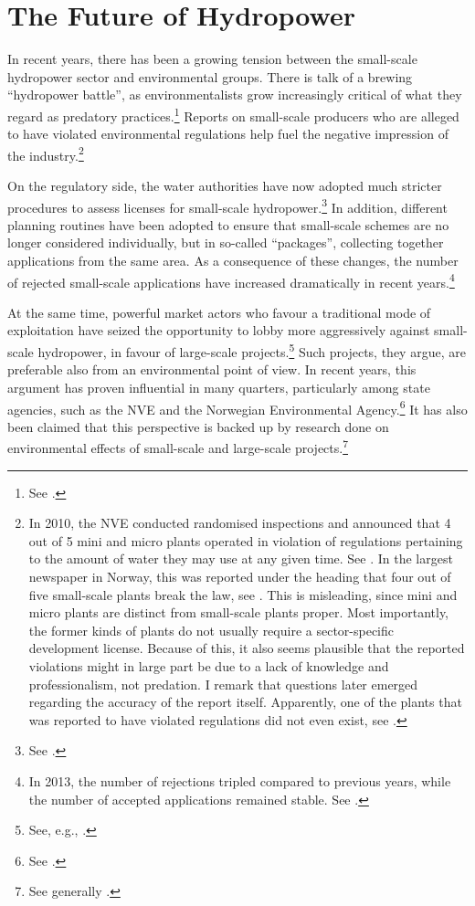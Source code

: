 \section{The Future of Hydropower}\label{sec:4:6}

In recent years, there has been a growing tension between the small-scale hydropower sector and environmental groups. There is talk of a brewing ``hydropower battle'', as environmentalists grow increasingly critical of what they regard as predatory practices.\footnote{See \cite{haltbrekken12}.}
Reports on small-scale producers who are alleged to have violated environmental regulations help fuel the negative impression of the industry.\footnote{In 2010, the NVE conducted randomised inspections and announced that 4 out of 5 mini and micro plants operated in violation of regulations pertaining to the amount of water they may use at any given time. See \cite{ulovlig10}. In the largest newspaper in Norway, this was reported under the heading that four out of five small-scale plants break the law, see \cite{ulovlig10b}. This is misleading, since mini and micro plants are distinct from small-scale plants proper. Most importantly, the former kinds of plants do not usually require a sector-specific development license. Because of this, it also seems plausible that the reported violations might in large part be due to a lack of knowledge and professionalism, not predation. I remark that questions later emerged regarding the accuracy of the report itself. Apparently, one of the plants that was reported to have violated regulations did not even exist, see \cite{tvilsom10}.}

On the regulatory side, the water authorities have now adopted much stricter procedures to assess licenses for small-scale hydropower.\footnote{See \cite{lie12}.} In addition, different planning routines have been adopted to ensure that small-scale schemes are no longer considered individually, but in so-called ``packages'', collecting together applications from the same area. As a consequence of these changes, the number of rejected small-scale applications have increased dramatically in recent years.\footnote{In 2013, the number of rejections tripled compared to previous years, while the number of accepted applications remained stable. See \cite{sunde14b}.}

At the same time, powerful market actors who favour a traditional mode of exploitation have seized the opportunity to lobby more aggressively against small-scale hydropower, in favour of large-scale projects.\footnote{See, e.g., \cite{alexandersen14}.} Such projects, they argue, are preferable also from an environmental point of view. In recent years, this argument has proven influential in many quarters, particularly among state agencies, such as the NVE and the Norwegian Environmental Agency.\footnote{See \cite{nilsen11}.} It has also been claimed that this perspective is backed up by research done on environmental effects of small-scale and large-scale projects.\footnote{See generally \cite{bakken12,bakken14}.}

